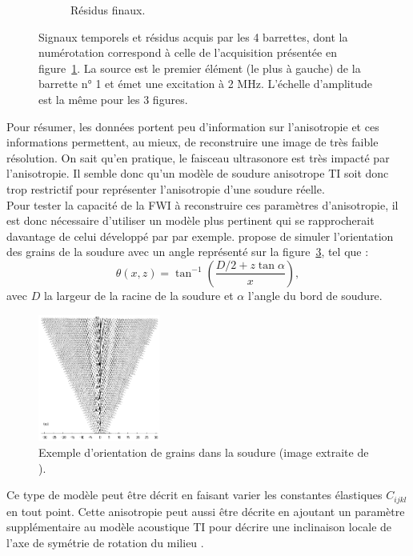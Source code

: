 \begin{figure}[h!]
\begin{changemargin}{-1cm}{-2cm}
\begin{subfigure}[b]{0.29\textwidth}
		\caption{Résidus finaux.\label{app:ani:data_ap}}
	\end{subfigure}
	\caption{ Signaux temporels et résidus acquis par les 4 barrettes, dont la numérotation correspond à celle de l'acquisition présentée en figure~\ref{app:ani:data_ap}. La source est le premier élément (le plus à gauche) de la barrette n° 1 et émet une excitation à 2 MHz.   L'échelle d'amplitude est la même pour les 3 figures. \label{app:ani:data}}
	\end{changemargin}
\end{figure}

 Pour résumer, les données portent peu d'information sur l'anisotropie et ces informations permettent, au mieux, de reconstruire une image de très faible résolution. On sait qu'en pratique, le faisceau ultrasonore est très impacté par l'anisotropie. Il semble donc qu'un modèle de soudure anisotrope TI soit donc trop restrictif pour représenter l'anisotropie d'une soudure réelle.\\
 
 Pour tester la capacité de la FWI à reconstruire ces paramètres d'anisotropie, il est donc nécessaire d'utiliser un modèle plus pertinent qui se rapprocherait davantage de celui développé par \cite{ogilvy} par exemple.	\cite{ogilvy} propose de simuler l'orientation des grains de la soudure avec un angle représenté sur la figure~\ref{ogilvy_soud}, tel que : 
	\begin{equation}
		\theta(x,z) = \tan^{-1}\left( \frac{D/2 + z\tan\alpha}{x} \right),
	\end{equation}
	avec $D$ la largeur de la racine de la soudure et $\alpha$  l'angle du bord de soudure. 
 
\begin{figure}[!h]
	\centering
			\includegraphics[width=4cm]{img/ogilvy_modele.png}
			\caption{ Exemple d'orientation de grains dans la soudure (image extraite de \cite{ogilvy}).\label{ogilvy_soud}}
\end{figure} 

Ce type de modèle peut être décrit en faisant varier les constantes élastiques $C_{ijkl}$ en tout point. Cette anisotropie peut aussi être décrite en ajoutant un paramètre supplémentaire au modèle acoustique TI pour décrire une inclinaison locale de l'axe de symétrie de rotation du milieu \citep{alkhalifah_VTI}.

